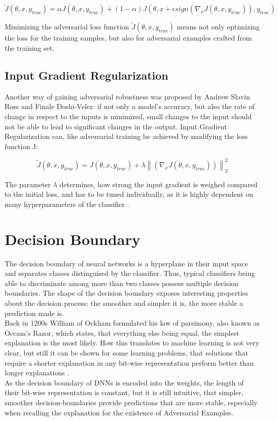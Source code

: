 \documentclass[draft,final]{vutinfth} %
\newcommand{\norm}[1]{\left\lVert#1\right\rVert}
\begin{document}
\begin{equation}
	\label{eq:adv_loss}
	\tilde{J}(\theta, x, y_{true}) = \alpha J(\theta, x, y_{true}) + (1-\alpha)J(\theta, x + \epsilon sign(\nabla_xJ(\theta, x, y_{true})), y_{true})
\end{equation}

Minimizing the adversarial loss function $\tilde{J}(\theta, x, y_{true})$ means not only optimizing the loss for the training samples, but also for adversarial examples crafted from the training set.
\cite{Goodfellow2015}

\subsection{Input Gradient Regularization}

Another way of gaining adversarial robustness was proposed by Andrew Slavin Ross and Finale Doshi-Velez: if not only a model's accuracy, but also the rate of change in respect to the inputs is minimized, small changes to the input should not be able to lead to significant changes in the output. 
Input Gradient Regularization can, like adversarial training be achieved by modifying the loss function J:

\begin{equation}
	\tilde{J}(\theta, x, y_{true}) = J(\theta, x, y_{true}) + \lambda \norm{(\nabla_x J(\theta, x, y_{true}))}_2^2
	\label{eq:gradreg}
\end{equation}

The parameter $\lambda$ determines, how strong the input gradient is weighed compared to the initial loss, and has to be tuned individually, as it is highly dependent on many hyperparameters of the classifier \cite{Ross2017}.

\section{Decision Boundary}

The decision boundary of neural networks is a hyperplane in their input space and separates classes distinguised by the classifier.
Thus, typical classifiers being able to discriminate among more than two classes possess multiple decision boundaries.
The shape of the decision boundary exposes interesting properties about the decision process: the smoother and simpler it is, the more stable a prediction made is.\\
Back in 1200s William of Ockham formulated his law of parsimony, also known as Occam’s Razor, which states, that everything else being equal, the simplest explanation is the most likely. 
How this translates to machine learning is not very clear, but still it can be shown for some learning problems, that solutions that require a shorter explanation in any bit-wise representation perform better than longer explanations \cite{Blumer1987}.\\
As the decision boundary of DNNs is encoded into the weights, the length of their bit-wise representation is constant, but it is still intuitive, that simpler, smoother decision-boundaries provide predictions that are more stable, especially when recalling the explanation for the existence of Adversarial Examples.\\
\end{document}
